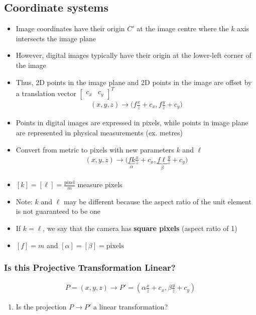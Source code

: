 \documentclass[letterpaper,12pt]{article}
\newcommand{\lra}{\ensuremath{\longrightarrow{}}}
\begin{document}
\subsection{Coordinate systems}
\begin{itemize}
 \item Image coordinates have their origin $C'$ at the image centre where the $k$ axis intersects the image plane
 \item However, digital images typically have their origin at the lower-left corner of the image
 \item Thus, 2D points in the image plane and 2D points in the image are offset by a translation vector $\begin{bmatrix}
         c_x & c_y
        \end{bmatrix}^T$
       \begin{align}
        (x,y,z) \lra \bigg(f\frac{x}{z} + c_x, f\frac{y}{z} + c_y\bigg)
       \end{align}
 \item Points in digital images are expressed in pixels, while points in image plane are represented in physical measurements (ex. metres)
 \item Convert from metric to pixels with new parameters $k$ and $\ell$
       \begin{align}
        (x,y,z) \lra \bigg(\underbrace{fk}_\alpha \frac{x}{z} + c_x, \underbrace{f\ell}_\beta \frac{y}{z} + c_y\bigg)
        \label{eq:projective_transformation}
       \end{align}
 \item $[k]=[\ell]=\frac{\text{pixel}}{m}$ measure pixels
 \item Note: $k$ and $\ell$ may be different because the aspect ratio of the unit element is not guaranteed to be one
 \item If $k=\ell$, we say that the camera has \textbf{square pixels} (aspect ratio of 1)
 \item $[f]=m$ and $[\alpha]=[\beta]=\text{pixels}$
\end{itemize}

\subsubsection{Is this Projective Transformation Linear?}
\begin{align}
 P=(x,y,z) \lra P'=(\alpha \frac{x}{z} + c_x, \beta \frac{y}{z} + c_y)
\end{align}
\begin{enumerate}
\item Is the projection $P \to P'$ a linear transformation?
\end{enumerate}
\end{document}

